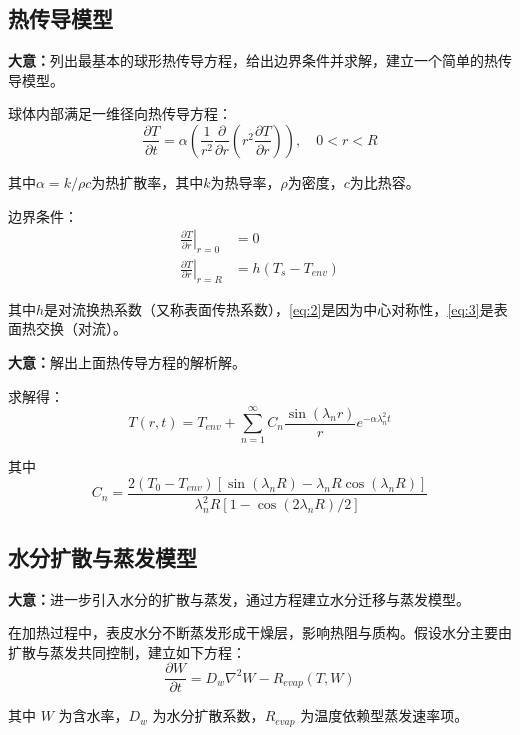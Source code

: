 \documentclass[12pt]{article}
\begin{document}
\subsection{热传导模型}
\begin{summarybox}
	\textbf{大意：}列出最基本的球形热传导方程，给出边界条件并求解，建立一个简单的热传导模型。
\end{summarybox}
球体内部满足一维径向热传导方程：
\begin{equation}
\frac{\partial T}{\partial t} = \alpha \left( \frac{1}{r^2} \frac{\partial}{\partial r}\left(r^2 \frac{\partial T}{\partial r} \right) \right), \quad 0 < r < R
\label{eq:1}
\end{equation}
\par 其中\(\alpha = k/\rho c\)为热扩散率，其中$k$为热导率，\(\rho\)为密度，$c$为比热容。
\par 边界条件：
\begin{align}
\left.\frac{\partial T}{\partial r}\right|_{r=0} &= 0 \label{eq:2}\\
\left.\frac{\partial T}{\partial r}\right|_{r=R} &= h(T_s - T_{env}) \label{eq:3}
\end{align}
\par 其中$h$是对流换热系数（又称表面传热系数），\eqref{eq:2}是因为中心对称性，\eqref{eq:3}是表面热交换（对流）。
\begin{summarybox}
	\textbf{大意：}解出上面热传导方程的解析解。
\end{summarybox}
\par 求解得：\[ T(r, t)=T_{env}+\sum_{n=1}^{\infty} C_{n} \frac{\sin \left(\lambda_{n} r\right)}{r} e^{-\alpha \lambda_{n}^{2} t}\]
\par 其中\[ C_n = \frac{2 (T_{0}-T_{env}) [\sin(\lambda_n R) - \lambda_n R \cos(\lambda_n R)]}{\lambda_n^2 R [1 - \cos(2\lambda_n R)/2]}\]

\subsection{水分扩散与蒸发模型}
\begin{summarybox}
	\textbf{大意：}进一步引入水分的扩散与蒸发，通过方程建立水分迁移与蒸发模型。
\end{summarybox}
在加热过程中，表皮水分不断蒸发形成干燥层，影响热阻与质构。假设水分主要由扩散与蒸发共同控制，建立如下方程：
\begin{equation}
\frac{\partial W}{\partial t} = D_w \nabla^2 W - R_{evap}(T, W)
\end{equation}
\par 其中 $W$ 为含水率，$D_w$ 为水分扩散系数，$R_{evap}$ 为温度依赖型蒸发速率项。
\end{document}
